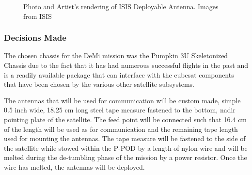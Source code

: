 \documentclass[12pt]{article}
\begin{document}
\begin{figure}[!ht]
\hfill
{}
\hfill
{}
\hfill
\caption{Photo and Artist’s rendering of ISIS Deployable Antenna. Images from ISIS~\cite{isis-image}}
\label{fig:str-2-3}
\end{figure}

\subsubsection{Decisions Made}
The chosen chassis for the DeMi mission was the Pumpkin 3U Skeletonized Chassis due to the fact that it has had numerous successful flights in the past and is a readily available package that can interface with the cubesat components that have been chosen by the various other satellite subsystems.

The antennas that will be used for communication will be custom made, simple 0.5 inch wide, 18.25 cm long steel tape measure fastened to the bottom, nadir pointing plate of the satellite. The feed point will be connected such that 16.4 cm of the length will be used as for communication and the remaining tape length used for mounting the antennas. The tape measure will be fastened to the side of the satellite while stowed within the P-POD by a length of nylon wire and will be melted during the de-tumbling phase of the mission by a power resistor. Once the wire has melted, the antennas will be deployed.
\end{document}
